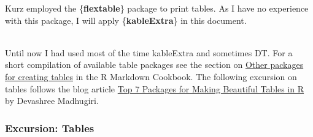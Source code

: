 \documentclass[
  letterpaper,
  DIV=11,
  numbers=noendperiod]{scrreprt}
\begin{document}
\begin{tcolorbox}[enhanced jigsaw, colframe=quarto-callout-note-color-frame, colback=white, toprule=.15mm, breakable, arc=.35mm, bottomtitle=1mm, colbacktitle=quarto-callout-note-color!10!white, toptitle=1mm, titlerule=0mm, title=\textcolor{quarto-callout-note-color}{\faInfo}\hspace{0.5em}{Table Packages Used}, leftrule=.75mm, opacityback=0, rightrule=.15mm, opacitybacktitle=0.6, bottomrule=.15mm, left=2mm, coltitle=black]

Kurz employed the \{\textbf{flextable}\} package to print tables. As I
have no experience with this package, I will apply
\{\textbf{kableExtra}\} in this document.\\
\strut \\
Until now I had used most of the time kableExtra and sometimes DT. For a
short compilation of available table packages see the section on
\href{https://bookdown.org/yihui/rmarkdown-cookbook/table-other.html}{Other
packages for creating tables} in the R Markdown Cookbook. The following
excursion on tables follows the blog article
\href{https://towardsdatascience.com/top-7-packages-for-making-beautiful-tables-in-r-7683d054e541}{Top
7 Packages for Making Beautiful Tables in R} by Devashree Madhugiri.

\end{tcolorbox}

\hypertarget{excursion-tables}{%
\subsubsection{Excursion: Tables}\label{excursion-tables}}
\end{document}
